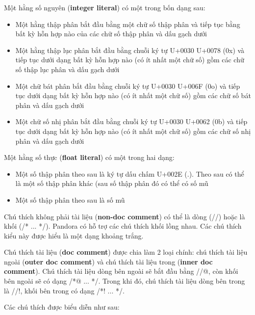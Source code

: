     \regexrawstringliteral

    Một hằng số nguyên (\textbf{integer literal}) có một trong bốn dạng sau:

    \begin{itemize}
        \item{Một hằng thập phân bắt đầu bằng một chữ số thập phân và tiếp tục bằng bất kỳ hỗn hợp nào của các chữ số thập phân và dấu gạch dưới}
        \item{Một hằng thập lục phân bắt đầu bằng chuỗi ký tự U+0030 U+0078 (0x) và tiếp tục dưới dạng bất kỳ hỗn hợp nào (có ít nhất một chữ số) gồm các chữ số thập lục phân và dấu gạch dưới}
        \item{Một chữ bát phân bắt đầu bằng chuỗi ký tự U+0030 U+006F (0o) và tiếp tục dưới dạng bất kỳ hỗn hợp nào (có ít nhất một chữ số) gồm các chữ số bát phân và dấu gạch dưới}
        \item{Một chữ số nhị phân bắt đầu bằng chuỗi ký tự U+0030 U+0062 (0b) và tiếp tục dưới dạng bất kỳ hỗn hợp nào (có ít nhất một chữ số) gồm các chữ số nhị phân và dấu gạch dưới}
    \end{itemize}

    \regexintegerliteral

    Một hằng số thực (\textbf{float literal}) có một trong hai dạng:
    \begin{itemize}
        \item{Một số thập phân theo sau là ký tự dấu chấm U+002E (.). Theo sau có thể là một số thập phân khác (sau số thập phân đó có thể có số mũ}
        \item{Một số thập phân theo sau là số mũ}
    \end{itemize}

    \regexfloatliteral

    Chú thích không phải tài liệu (\textbf{non-doc comment}) có thể là dòng (//) hoặc là khối (/* ... */). Pandora có hỗ trợ các chú thích khối lồng nhau. Các chú thích kiểu này được hiểu là một dạng khoảng trắng.

    Chú thích tài liệu (\textbf{doc comment}) được chia làm 2 loại chính: chú thích tài liệu ngoài (\textbf{outer doc comment}) và chú thích tài liệu trong (\textbf{inner doc comment}). Chú thích tài liệu dòng bên ngoài sẽ bắt đầu bằng //@, còn khối bên ngoài sẽ có dạng /*@ ... */. Trong khi đó, chú thích tài liệu dòng bên trong là //!, khối bên trong có dạng /*! ... */.

    Các chú thích được biểu diễn như sau:

    \regexlinecomment

    \regexblockcomment

    \regexdoc

